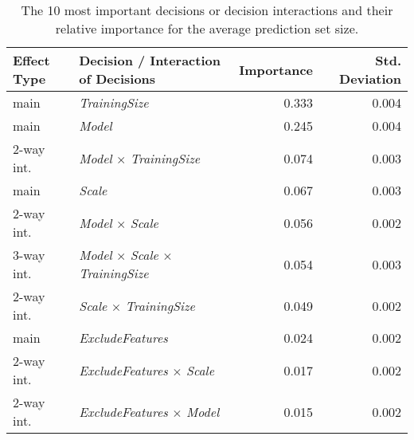 \begin{table}
\centering
\caption{The 10 most important decisions or decision interactions and their relative importance for the average prediction set size.}
\label{tab:fanova_top10}
\begin{tabular}{llrr}
\toprule
Effect Type &                                   Decision / Interaction of Decisions &  Importance &  Std. Deviation \\
\midrule
       main &                                                 \textit{TrainingSize} &       0.333 &           0.004 \\
       main &                                                        \textit{Model} &       0.245 &           0.004 \\
 2-way int. &                         \textit{Model} $\times$ \textit{TrainingSize} &       0.074 &           0.003 \\
       main &                                                        \textit{Scale} &       0.067 &           0.003 \\
 2-way int. &                                \textit{Model} $\times$ \textit{Scale} &       0.056 &           0.002 \\
 3-way int. & \textit{Model} $\times$ \textit{Scale} $\times$ \textit{TrainingSize} &       0.054 &           0.003 \\
 2-way int. &                         \textit{Scale} $\times$ \textit{TrainingSize} &       0.049 &           0.002 \\
       main &                                              \textit{ExcludeFeatures} &       0.024 &           0.002 \\
 2-way int. &                      \textit{ExcludeFeatures} $\times$ \textit{Scale} &       0.017 &           0.002 \\
 2-way int. &                      \textit{ExcludeFeatures} $\times$ \textit{Model} &       0.015 &           0.002 \\
\bottomrule
\end{tabular}
\end{table}
